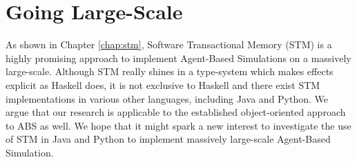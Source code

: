 

\section{Going Large-Scale}
As shown in Chapter \ref{chap:stm}, Software Transactional Memory (STM) is a highly promising approach to implement Agent-Based Simulations on a massively large-scale. Although STM really shines in a type-system which makes effects explicit as Haskell does, it is not exclusive to Haskell and there exist STM implementations in various other languages, including Java and Python. We argue that our research is applicable to the established object-oriented approach to ABS as well. We hope that it might spark a new interest to investigate the use of STM in Java and Python to implement massively large-scale Agent-Based Simulation.